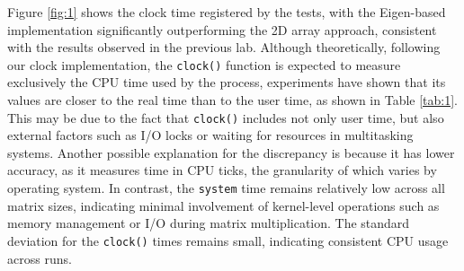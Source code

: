 \documentclass{article}
\begin{document}
    Figure \ref{fig:1} shows the clock time registered by the tests, with the Eigen-based implementation significantly outperforming the 2D array approach, consistent with the results observed in the previous lab. 
    Although theoretically, following our clock implementation, the \texttt{clock()} function is expected to measure exclusively the CPU time used by the process, experiments have shown that its values are closer to the real time than to the user time, as shown in Table \ref{tab:1}. This may be due to the fact that \texttt{clock()} includes not only user time, but also external factors such as I/O locks or waiting for resources in multitasking systems. Another possible explanation for the discrepancy is because it has lower accuracy, as it measures time in CPU ticks, the granularity of which varies by operating system.  In contrast, the \texttt{system} time remains relatively low across all matrix sizes, indicating minimal involvement of kernel-level operations such as memory management or I/O during matrix multiplication. The standard deviation for the \texttt{clock()} times remains small, indicating consistent CPU usage across runs.
\end{document}
